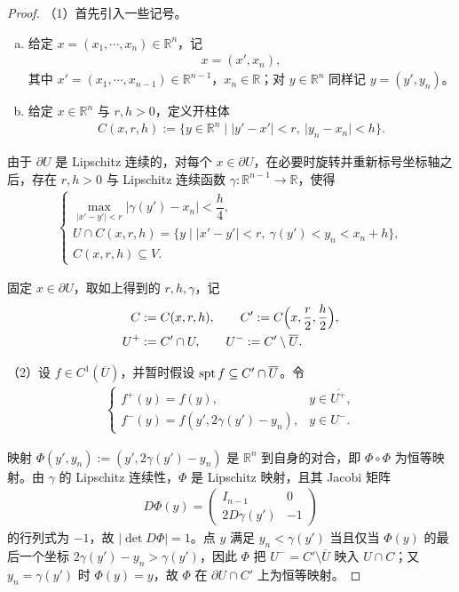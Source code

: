 \documentclass[../../main.tex]{subfiles}%
\begin{document}
\begin{proof}
（1）首先引入一些记号。

\begin{enumerate}[(a)]
\item 给定 $x=(x_1,\cdots,x_n)\in\mathbb{R}^n$，记
\begin{align*}
x=(x',x_n),
\end{align*}
其中 $x'=(x_1,\cdots,x_{n-1})\in\mathbb{R}^{n-1}$，$x_n\in\mathbb{R}$；对 $y\in\mathbb{R}^n$ 同样记 $y=(y',y_n)$。
\item 给定 $x\in\mathbb{R}^n$ 与 $r,h>0$，定义开柱体
\begin{align*}
C(x,r,h):=\{y\in\mathbb{R}^n\mid\lvert y'-x'\rvert<r,\ \lvert y_n-x_n\rvert<h\}.
\end{align*}
\end{enumerate}

由于 $\partial U$ 是 Lipschitz 连续的，对每个 $x\in\partial U$，在必要时旋转并重新标号坐标轴之后，存在 $r,h>0$ 与 Lipschitz 连续函数 $\gamma:\mathbb{R}^{n-1}\to\mathbb{R}$，使得
\begin{align*}
\begin{cases}
\max_{\lvert x'-y'\rvert<r}\lvert\gamma(y')-x_n\rvert<\dfrac{h}{4},\\[6pt]
U\cap C(x,r,h)=\{y\mid\lvert x'-y'\rvert<r,\ \gamma(y')<y_n<x_n+h\},\\[2pt]
C(x,r,h)\subseteq V.
\end{cases}
\end{align*}

固定 $x\in\partial U$，取如上得到的 $r,h,\gamma$，记
\begin{align*}
C&:=C(x,r,h),\qquad C':=C\Bigl(x,\frac{r}{2},\frac{h}{2}\Bigr),\\
U^+&:=C'\cap U,\qquad U^-:=C'\setminus\overline{U}.
\end{align*}

（2）设 $f\in C^1(\overline{U})$，并暂时假设 $\operatorname{spt} f\subseteq C'\cap\overline{U}$。令
\begin{align*}
\begin{cases}
f^+(y)=f(y), & y\in\overline{U^+},\\[2pt]
f^-(y)=f(y',2\gamma(y')-y_n), & y\in U^-.
\end{cases}
\end{align*}

映射 $\Phi(y',y_n):=(y',2\gamma(y')-y_n)$ 是 $\mathbb{R}^n$ 到自身的对合，即 $\Phi\circ\Phi$ 为恒等映射。由 $\gamma$ 的 Lipschitz 连续性，$\Phi$ 是 Lipschitz 映射，且其 Jacobi 矩阵
\begin{align*}
D\Phi(y)=\begin{pmatrix}I_{n-1}&0\\ 2D\gamma(y')&-1\end{pmatrix}
\end{align*}
的行列式为 $-1$，故 $\lvert\det D\Phi\rvert=1$。点 $y$ 满足 $y_n<\gamma(y')$ 当且仅当 $\Phi(y)$ 的最后一个坐标 $2\gamma(y')-y_n>\gamma(y')$，因此 $\Phi$ 把 $U^-=C'\setminus\overline{U}$ 映入 $U\cap C$；又 $y_n=\gamma(y')$ 时 $\Phi(y)=y$，故 $\Phi$ 在 $\partial U\cap C'$ 上为恒等映射。


\end{proof}
\end{document}
